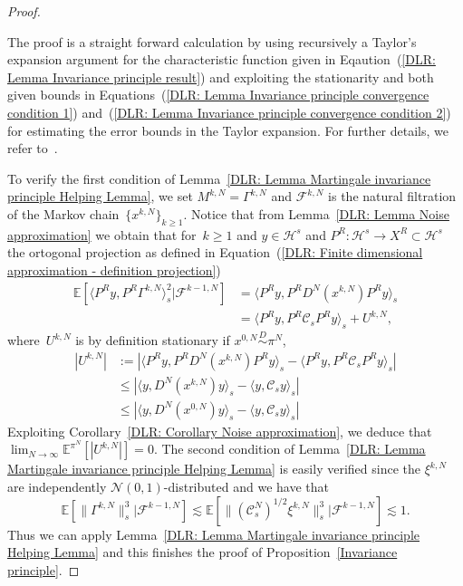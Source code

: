 \begin{proof}
\begin{lemma}
  \end{lemma}
  The proof is a straight forward calculation by using recursively a Taylor's expansion argument for the characteristic function given in Eqaution~(\ref{DLR: Lemma Invariance principle result}) and exploiting the stationarity and both given bounds in Equations~(\ref{DLR: Lemma Invariance principle convergence condition 1}) and~(\ref{DLR: Lemma Invariance principle convergence condition 2}) for estimating the error bounds in the Taylor expansion. For further details, we refer to~\autocite[Lemma 4.3]{Mattingly2010}.
  
  To verify the first condition of Lemma~\ref{DLR: Lemma Martingale invariance principle Helping Lemma}, we set $M^{k,N} = \Gamma^{k,N} $ and $ \mathcal{F}^{k,N} $ is the natural filtration of the Markov chain~$ \{ x^{k,N} \} _{k \geq 1}$. Notice that from Lemma~\ref{DLR: Lemma Noise approximation} we obtain that for~$k \geq 1$ and $y \in \mathcal{H}^s$ and $P^R :\mathcal{H}^s \to X^R \subset \mathcal{H}^s$ the ortogonal projection as defined in Equation~(\ref{DLR: Finite dimensional approximation - definition projection})
  \begin{align*}
    \mathbb{E}[ \langle P^Ry, P^R \Gamma^{k,N} \rangle_s^2 | \mathcal{F}^{k-1,N}] & = \langle P^Ry,P^R D^N(x^{k,N}) P^R y \rangle_s \\
    & = \langle P^R y, P^R \mathcal{C}_s P^R y \rangle_s + U^{k,N},
  \end{align*}
  where~$U^{k,N}$ is by definition stationary if $ x^{0,N}\stackrel{D}{\sim} \pi^N$,
  \begin{align*}
    |U^{k,N}| & := | \langle P^R y, P^R D^N(x^{k,N}) P^R y \rangle_s  - \langle P^R y, P^R \mathcal{C}_s P^R y \rangle_s  |\\
    & \leq |\langle y,  D^N(x^{k,N}) y \rangle_s  - \langle  y,  \mathcal{C}_s y \rangle_s |\\
    & \leq |\langle y,  D^N(x^{0,N}) y \rangle_s  - \langle  y,  \mathcal{C}_s y \rangle_s |
  \end{align*}
  Exploiting Corollary~\ref{DLR: Corollary Noise approximation}, we deduce that $ \lim_{N \to \infty}\mathbb{E}^{\pi^N}[|U^{k,N}|]=0 $. The second condition of Lemma~\ref{DLR: Lemma Martingale invariance principle Helping Lemma} is easily verified since the $ \xi^{k,N} $ are independently $\mathcal{N}(0,1)$-distributed and we have that
  \begin{equation*}
    \mathbb{E}[ \| \Gamma^{k,N} \|_s^3  |\mathcal{F}^{k-1,N}] \lesssim \mathbb{E}[ \| (\mathcal{C}_s^N)^{1/2} \xi^{k,N}  \|_s^3  |\mathcal{F}^{k-1,N}] \lesssim 1.
  \end{equation*}
  Thus we can apply Lemma~\ref{DLR: Lemma Martingale invariance principle Helping Lemma} and this finishes the proof of Proposition~\ref{Invariance principle}.



  
\end{proof}

